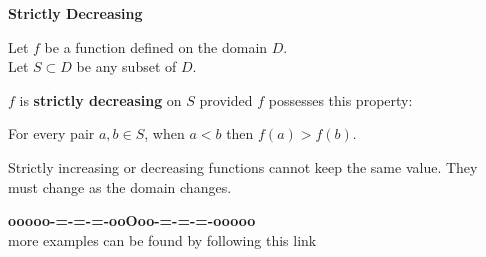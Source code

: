 \documentclass{ximera}
\begin{document}
\begin{definition} \textbf{\textcolor{green!50!black}{Strictly Decreasing}} 


Let $f$ be a function defined on the domain $D$. \\
Let $S \subset D$ be any subset of $D$.

$f$ is \textbf{strictly decreasing} on $S$ provided $f$ possesses this property:  


\begin{center}
For every pair $a, b \in S$, when $a < b$ then $f(a) > f(b)$.
\end{center}

\end{definition}




Strictly increasing or decreasing functions cannot keep the same value.  They must change as the domain changes.














\begin{center}
\textbf{\textcolor{green!50!black}{ooooo-=-=-=-ooOoo-=-=-=-ooooo}} \\

more examples can be found by following this link\\ 

\end{center}
\end{document}
